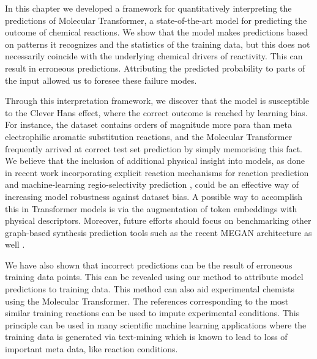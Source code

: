 
In this chapter we developed a framework for quantitatively interpreting the predictions of Molecular Transformer, a state-of-the-art model for predicting the outcome of chemical reactions. We show that the model makes predictions based on patterns it recognizes and the statistics of the training data, but this does not necessarily coincide with the underlying chemical drivers of reactivity. This can result in erroneous predictions. Attributing the predicted probability to parts of the input allowed us to foresee these failure modes. 

Through this interpretation framework, we discover that the model is susceptible to the Clever Hans effect, where the correct outcome is reached by learning bias. For instance, the dataset contains orders of magnitude more para than meta electrophilic aromatic substitution reactions, and the Molecular Transformer frequently arrived at correct test set prediction by simply memorising this fact. We believe that the inclusion of additional physical insight into models, as done in recent work incorporating explicit reaction mechanisms for reaction prediction \cite{bradshaw2019generative} and machine-learning regio-selectivity prediction \cite{guan_coley_robust}, could be an effective way of increasing model robustness against dataset bias. A possible way to accomplish this in Transformer models is via the augmentation of token embeddings with physical descriptors. Moreover, future efforts should focus on benchmarking other graph-based synthesis prediction tools such as the recent MEGAN architecture as well \cite{sacha2020molecule}.

We have also shown that incorrect predictions can be the result of erroneous training data points. This can be revealed using our method to attribute model predictions to training data. This method can also aid experimental chemists using the Molecular Transformer. The references corresponding to the most similar training reactions can be used to impute experimental conditions. This principle can be used in many scientific machine learning applications where the training data is generated via text-mining which is known to lead to loss of important meta data, like reaction conditions. 

